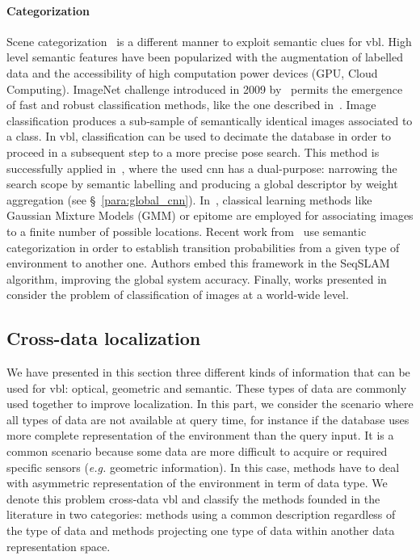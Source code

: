 		\paragraph{Categorization}
			Scene categorization~\citep{Wu2009} is a different manner to exploit semantic clues for \ac{vbl}. High level semantic features have been popularized with the augmentation of labelled data and the accessibility of high computation power devices (GPU, Cloud Computing). ImageNet challenge introduced in 2009 by~\citep{Deng2009} permits the emergence of fast and robust classification methods, like the one described in~\citep{Krizhevsky2012}. Image classification produces a sub-sample of semantically identical images associated to a class. In \ac{vbl}, classification can be used to decimate the database in order to proceed in a subsequent step to a more precise pose search. This method is successfully applied in~\citep{Sunderhauf2015}, where the used \ac{cnn} has a dual-purpose: narrowing the search scope by semantic labelling and producing a global descriptor by weight aggregation (see \S~\ref{para:global_cnn}). In~\citep{torralba2003context,Ni2009}, classical learning methods like Gaussian Mixture Models (GMM) or epitome are employed for associating images to a finite number of possible locations. Recent work from~\citep{Garg2017} use semantic categorization in order to establish transition probabilities from a given type of environment to another one. Authors embed this framework in the SeqSLAM algorithm, improving the global system accuracy. Finally, works presented in~\citep{Hays2008,Weyand2016} consider the problem of classification of images at a world-wide level.
			
	\subsection{Cross-data localization}
	\label{subsec:cross_data}        
		We have presented in this section three different kinds of information that can be used for \ac{vbl}: optical, geometric and semantic. These types of data are commonly used together to improve localization. In this part, we consider the scenario where all types of data are not available at query time, for instance if the database uses more complete representation of the environment than the query input. It is a common scenario because some data are more difficult to acquire or required specific sensors (\textit{e.g.} geometric information). In this case, methods have to deal with asymmetric representation of the environment in term of data type. We denote this problem cross-data \ac{vbl} and classify the methods founded in the literature in two categories: methods using a common description regardless of the type of data and methods projecting one type of data within another data representation space.
		
